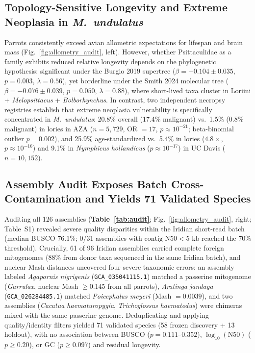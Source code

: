 \documentclass[10pt,a4paper,twocolumn]{article}
\begin{document}
\subsection{Topology-Sensitive Longevity and Extreme Neoplasia in \textit{M.\ undulatus}}
Parrots consistently exceed avian allometric expectations for lifespan and brain mass (Fig.~\ref{fig:allometry_audit}, left). However, whether Psittaculidae as a family exhibits reduced relative longevity depends on the phylogenetic hypothesis: significant under the Burgio 2019 supertree ($\beta = -0.104 \pm 0.035$, $p = 0.003$, $\lambda = 0.56$), yet borderline under the Smith 2024 molecular tree ($\beta = -0.076 \pm 0.039$, $p = 0.050$, $\lambda = 0.88$), where short-lived taxa cluster in Loriini + \textit{Melopsittacus} + \textit{Bolborhynchus}. In contrast, two independent necropsy registries establish that extreme neoplasia vulnerability is specifically concentrated in \textit{M.\ undulatus}: 20.8\% overall (17.4\% malignant) vs.\ 1.5\% (0.8\% malignant) in lories in AZA ($n = 5,729$, OR $= 17$, $p \approx 10^{-21}$; beta-binomial outlier $p = 0.002$), and 25.9\% age-standardized vs.\ 5.4\% in lories ($4.8\times$, $p \approx 10^{-16}$) and 9.1\% in \textit{Nymphicus hollandicus} ($p \approx 10^{-17}$) in UC Davis ($n = 10,152$).

\subsection{Assembly Audit Exposes Batch Cross-Contamination and Yields 71 Validated Species}
Auditing all 126 assemblies (\textbf{Table~\ref{tab:audit}}; Fig.~\ref{fig:allometry_audit}, right; Table~S1) revealed severe quality disparities within the Iridian short-read batch (median BUSCO 76.1\%; 0/31 assemblies with $\text{contig N50} < 5\text{ kb}$ reached the 70\% threshold). Crucially, 61 of 96 Iridian assemblies carried complete foreign mitogenomes (88\% from donor taxa sequenced in the same Iridian batch), and nuclear Mash distances uncovered four severe taxonomic errors: an assembly labeled \textit{Agapornis nigrigenis} (\texttt{GCA\_035041115.1}) matched a passerine mitogenome (\textit{Garrulax}, nuclear Mash $\ge 0.145$ from all parrots), \textit{Aratinga jandaya} (\texttt{GCA\_026284485.1}) matched \textit{Poicephalus meyeri} (Mash $= 0.0039$), and two assemblies (\textit{Cacatua haematuropygia}, \textit{Trichoglossus haematodus}) were chimeras mixed with the same passerine genome. Deduplicating and applying quality/identity filters yielded 71 validated species (58 frozen discovery + 13 holdout), with no association between BUSCO ($p = 0.111$--$0.352$), $\log_{10}(\text{N50})$ ($p \ge 0.20$), or GC ($p \ge 0.097$) and residual longevity.
\end{document}
